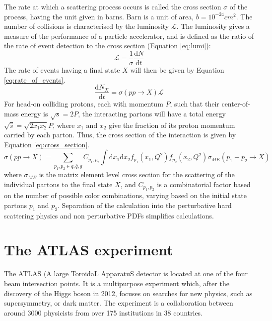 \documentclass[11pt,a4paper,openright,twoside]{report}
\begin{document}
The rate at which a scattering process occurs is called the cross section $\sigma$ of the process, having the unit given in barns. Barn is a unit of area, $b = 10^{-24}cm^2$. The number of collisions is characterised by the luminosity $\mathcal{L}$. The luminosity gives a measure of the performance of a particle accelerator, and is defined as the ratio of the rate of event detection to the cross section (Equation \ref{eq:lumi}):
\begin{equation}
\mathcal{L} = \frac{1}{\sigma}\frac{\text{d}N}{\text{d}t}
\label{eq:lumi}
\end{equation}
The rate of events having a final state $X$ will then be given by Equation \ref{eq:rate_of_events}.
\begin{equation}
\frac{\text{d}N_X}{\text{d}t} = \sigma(pp\to X)\mathcal{L}
\label{eq:rate_of_events}
\end{equation}
For head-on colliding protons, each with momentum $P$, such that their center-of-mass energy is $\sqrt{s}=2P$, the interacting partons will have a total energy $\sqrt{\hat{s}}=\sqrt{2x_1x_2}P$, where $x_1$ and $x_2$ give the fraction of its proton momentum carried by each parton. Thus, the cross section of the interaction is given by Equation \ref{eq:cross_section}.
\begin{equation}
\sigma(pp\to X) = \sum_{p_1,p_2\in q,\bar{q},g} C_{p_1,p_2}\int\text{d}x_1\text{d}x_2 f_{p_1}(x_1,Q^2)f_{p_2}(x_2,Q^2)\sigma_{ME}(p_1+p_2\to X)
\label{eq:cross_section}
\end{equation}
where $\sigma_{ME}$ is the matrix element level cross section for the scattering of the individual partons to the final state $X$, and $C_{p_1,p_2}$ is a combinatorial factor based on the number of possible color combinations, varying based on the initial state partons $p_1$ and $p_2$. Separation of the calculation into the perturbative hard scattering physics and non perturbative PDFs simplifies calculations.

\section{The ATLAS experiment}
The ATLAS (A large ToroidaL ApparatuS detector is located at one of the four beam intersection points. It is a multipurpose experiment which, after the discovery of the Higgs boson in 2012, focuses on searches for new physics, such as supersymmetry, or dark matter. The experiment is a collaboration between around 3000 physicists from over 175 institutions in 38 countries.
\end{document}
